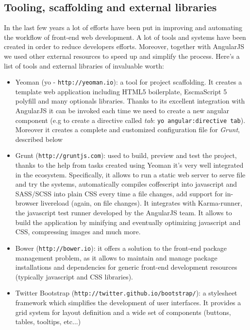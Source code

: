 \documentclass[a4paper,12pt]{report}
\begin{document}
\subsection{Tooling, scaffolding and external libraries}
In the last few years a lot of efforts have been put in improving and automating the workflow of front-end web development. A lot of tools and systems have been created in order to reduce developers efforts. 
Moreover, together with AngularJS we used other external resources to speed up and simplify the process. Here's a list of tools and external libraries of invaluable worth:
\begin{itemize}
\item Yeoman (yo - \texttt{http://yeoman.io}): a tool for project scaffolding. It creates a template web application including HTML5 boilerplate, EscmaScript 5 polyfill and many optionals libraries. Thanks to its excellent integration with AngularJS it can be invoked each time we need to create a new angular component (e.g to create a directive called \emph{tab}: \texttt{yo angular:directive tab}). Moreover it creates a complete and customized configuration file for \emph{Grunt}, described below
\item Grunt (\texttt{http://gruntjs.com}): used to build, preview and test the project, thanks to the help from tasks created using Yeoman it's very well integrated in the ecosystem. Specifically, it allows to run a static web server to serve file and try the systems, automatically compiles coffescript into javascript and SASS/SCSS into plain CSS every time a file changes, add support for in-browser livereload (again, on file changes). It integrates with Karma-runner, the javascript test runner developed by the AngularJS team. It allows to build the application by minifying and eventually optimizing javascript and CSS, compressing images and much more.
\item Bower (\texttt{http://bower.io}): it offers a solution to the front-end package management problem, as it allows to maintain and manage package installations and dependencies for generic front-end development resources (typically javascript and CSS libraries). 
\item Twitter Bootstrap (\texttt{http://twitter.github.io/bootstrap/}): a stylesheet framework which simplifies the development of user interfaces. It provides a grid system for layout definition and a wide set of components (buttons, tables, tooltips, etc...) 
\end{itemize}
\end{document}
